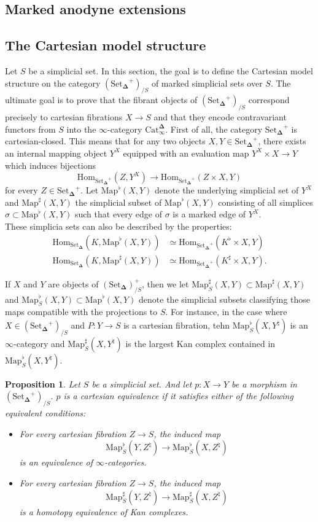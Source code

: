 \documentclass{amsart}
\newcommand{\8}{\ensuremath{\infty}}
\newcommand{\SSet}{\ensuremath{\text{Set}_{\boldsymbol{\Delta}}}}
\newcommand{\Catinfdel}{\ensuremath{\text{Cat}^{\boldsymbol{\Delta}}_{\infty}}}
\newcommand{\Map}{\ensuremath{\text{Map}}}
\newcommand{\Hom}{\ensuremath{\text{Hom}}}
\newtheorem{proposition}{Proposition}
\begin{document}
\subsection{Marked anodyne extensions}

\subsection{The Cartesian model structure}
Let $S$ be a simplicial set. In this section, the goal is to define the Cartesian model structure on the category $(\SSet^+)_{/S}$ of marked simplicial sets over $S$. The ultimate goal is to prove that the fibrant objects of $(\SSet^+)_{/S}$ correspond precisely to cartesian fibrations $X\rightarrow S$ and that they encode contravariant functors from $S$ into the \8-category \Catinfdel.
First of all, the category $\SSet^+$ is cartesian-closed. This means that for any two objects $X,Y\in \SSet^+$, there exists an internal mapping object $Y^X$ equipped with an evaluation map $Y^X\times X\rightarrow Y$ which induces bijections 
\[\text{Hom}_{\SSet^+}(Z,Y^X)\rightarrow \text{Hom}_{\SSet^+}(Z\times X,Y)\]
for every $Z\in\SSet^+$. Let $\Map^\flat(X,Y)$ denote the underlying simplicial set of $Y^X$ and $\Map^\sharp(X,Y)$ the simplicial subset of $\Map^\flat(X,Y)$ consisting of all simplices $\sigma\subset \Map^\flat(X,Y)$ such that every edge of $\sigma$ is a marked edge of $Y^X$.\\
These simplicia sets can also be described by the properties:
\begin{align*}
  \Hom_{\SSet}(K,\Map^\flat(X,Y))&\simeq \Hom_{\SSet^+}(K^\flat\times X,Y)\\
  \Hom_{\SSet}(K,\Map^\sharp(X,Y)) &\simeq \Hom_{\SSet^+}(K^\sharp\times X,Y).
\end{align*}

If $X$ and $Y$ are objects of $(\SSet)^+_{/S}$, then we let $\Map_S^\sharp(X,Y) \subset \Map^\sharp(X,Y)$ and $\Map_S^\flat(X,Y) \subset \Map^\flat(X,Y)$ denote the simplicial subsets classifying those maps compatible with the projections to $S$. For instance, in the case where $X\in(\SSet^+)_{/S}$ and $P:Y\rightarrow S$ is a cartesian fibration, tehn $\Map^\flat_S(X,Y^\natural)$ is an \8-category and $\Map^\sharp_S(X,Y^\natural)$ is the largest Kan complex contained in $\Map^\flat_S(X,Y^\natural).$

\begin{proposition}
  Let $S$ be a simplicial set. And let $p:X\rightarrow Y$ be a morphism in $(\SSet^+)_{/S}$. $p$ is a cartesian equivalence if it satisfies either of the following equivalent conditions:
  \begin{itemize}
    \item[(1)] For every cartesian fibration $Z\rightarrow S$, the induced map
    \[\Map^\flat_S(Y,Z^\natural)\rightarrow \Map_S^\flat(X,Z^\natural)\] is an equivalence of \8-categories.
    \item[(2)] For every cartesian fibration $Z\rightarrow S$, the induced map \[\Map^\sharp_S(Y,Z^\natural)\rightarrow \Map_S^\sharp(X,Z^\natural)\] is a homotopy equivalence of Kan complexes.
  \end{itemize}
\end{proposition}
\end{document}
